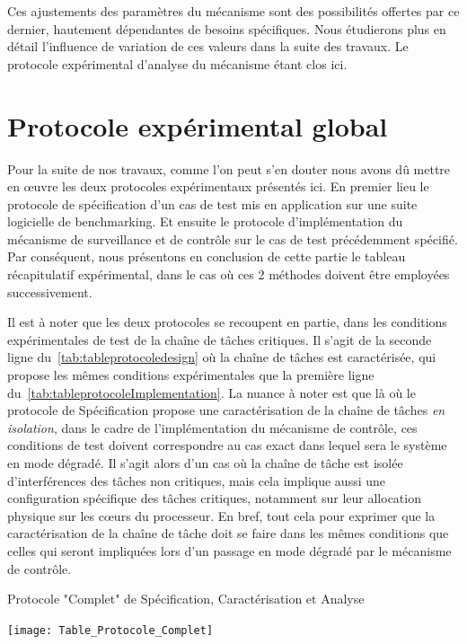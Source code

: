 \documentclass[french, a4paper, 11pt, twoside, pdftex]{StyleThese}
\begin{document}
		 Ces ajustements des paramètres du mécanisme sont des possibilités offertes par ce dernier, hautement dépendantes de besoins spécifiques. Nous étudierons plus en détail l'influence de variation de ces valeurs dans la suite des travaux. Le protocole expérimental d'analyse du mécanisme étant clos ici.    	
                	
                	
\section{Protocole expérimental global}
    
    Pour la suite de nos travaux, comme l'on peut s'en douter nous avons dû mettre en œuvre les deux protocoles expérimentaux présentés ici. En premier lieu le protocole de spécification d'un cas de test mis en application sur une suite logicielle de benchmarking. Et ensuite le protocole d'implémentation du mécanisme de surveillance et de contrôle sur le cas de test précédemment spécifié. Par conséquent, nous présentons en conclusion de cette partie le tableau récapitulatif expérimental, dans le cas où ces 2 méthodes doivent être employées successivement.
    
    Il est à noter que les deux protocoles se recoupent en partie, dans les conditions expérimentales de test de la chaîne de tâches critiques. Il s'agit de la seconde ligne du~\autoref{tab:tableprotocoledesign} où la chaîne de tâches est caractérisée, qui propose les mêmes conditions expérimentales que la première ligne du~\autoref{tab:tableprotocoleImplementation}. La nuance à noter est que là où le protocole de Spécification propose une caractérisation de la chaîne de tâches \textit{en isolation}, dans le cadre de l'implémentation du mécanisme de contrôle, ces conditions de test doivent correspondre au cas exact dans lequel sera le système en mode dégradé. Il s'agit alors d'un cas où la chaîne de tâche est isolée d'interférences des tâches non critiques, mais cela implique aussi une configuration spécifique des tâches critiques, notamment sur leur allocation physique sur les cœurs du processeur. 
    En bref, tout cela pour exprimer que la caractérisation de la chaîne de tâche doit se faire dans les mêmes conditions que celles qui seront impliquées lors d'un passage en mode dégradé par le mécanisme de contrôle.
    
    \begin{table}[ht]
    	\centering
    	\caption{Protocole "Complet" de Spécification, Caractérisation et Analyse}
    	\label{tab:tableprotocoleComplet}
    	\texttt{[image: Table\_Protocole\_Complet]}
    \end{table}
\end{document}
